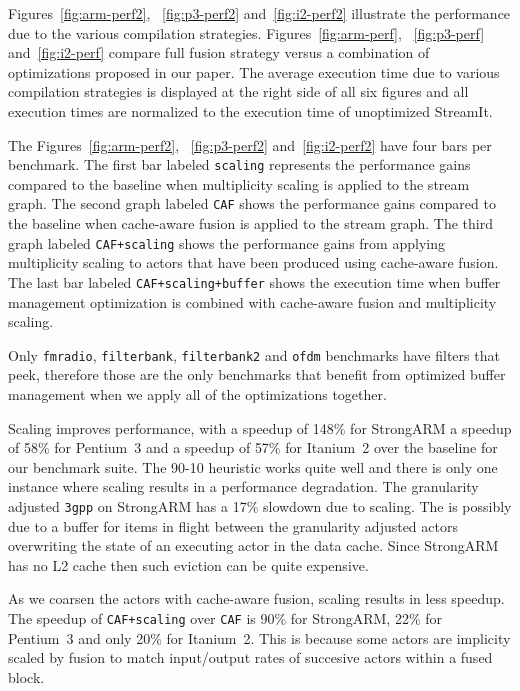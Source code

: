 Figures~\ref{fig:arm-perf2}, ~\ref{fig:p3-perf2} and~\ref{fig:i2-perf2} 
illustrate the performance due to the various compilation strategies. 
Figures~\ref{fig:arm-perf}, ~\ref{fig:p3-perf} and~\ref{fig:i2-perf} 
compare full fusion strategy versus a combination of optimizations 
proposed in our paper. The average execution time due to various compilation 
strategies is displayed at the right side of all six figures and all 
execution times are normalized to the execution time of unoptimized 
StreamIt.


The Figures~\ref{fig:arm-perf2}, ~\ref{fig:p3-perf2} and~\ref{fig:i2-perf2} 
have four bars per benchmark. The first bar labeled {\tt scaling}
represents the performance gains compared to the baseline when multiplicity
scaling is applied to the stream graph. The second graph labeled 
{\tt CAF} shows the performance gains compared to the baseline when 
cache-aware fusion is applied to the stream graph. The third graph
labeled {\tt CAF+scaling} shows the performance gains from applying
multiplicity scaling to actors that have been produced using cache-aware
fusion. The last bar labeled \texttt{CAF+scaling+buffer} shows the
execution time when buffer management optimization is combined with
cache-aware fusion and multiplicity scaling.


Only \texttt{fmradio}, \texttt{filterbank}, \texttt{filterbank2}
and \texttt{ofdm} benchmarks have filters that peek, therefore those are the 
only benchmarks that benefit from optimized buffer management when we 
apply all of the optimizations together. 


Scaling improves performance, with a speedup of 148\% for
StrongARM a speedup of 58\% for Pentium~3 and a speedup of 57\% for Itanium~2 over the baseline for our benchmark suite. 
The 90-10 heuristic works quite well and there is only one instance
where scaling results in a performance degradation. The granularity adjusted
\texttt{3gpp} on StrongARM has a 17\% slowdown due to scaling. The is possibly 
due to a buffer for items in flight between the granularity adjusted
actors overwriting the state of an executing actor in the data cache.
Since StrongARM has no L2 cache then such eviction can be quite expensive.

As we coarsen the actors with cache-aware fusion, scaling results 
in less speedup. The speedup of \texttt{CAF+scaling} over \texttt{CAF} is
90\% for StrongARM, 22\% for Pentium~3 and only 20\% for Itanium~2. 
This is because some actors are implicity scaled by fusion to match 
input/output rates of succesive actors within a fused block. 


